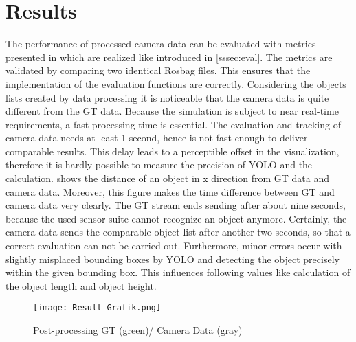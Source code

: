 \section{Results}\label{Results}
	
	The performance of processed camera data can be evaluated with metrics presented in \cite{Reway} which are realized like introduced in \cref{sssec:eval}. The metrics are validated by comparing two identical Rosbag files. This ensures that the implementation of the evaluation functions are correctly.
	Considering the objects lists created by data processing it is noticeable that the camera data is quite different from the \ac{GT} data. Because the simulation is subject to near real-time requirements, a fast processing time is essential. The evaluation and tracking of camera data needs at least 1 second, hence is not fast enough to deliver comparable results. This delay leads to a perceptible offset in the visualization, therefore it is hardly possible to measure the precision of \ac{YOLO} and the calculation.
	 shows the distance of an object in x direction from \ac{GT} data and camera data. Moreover, this figure  makes the time difference between \ac{GT} and camera data very clearly. The \ac{GT} stream ends sending after about nine seconds, because the used sensor suite cannot recognize an object anymore. Certainly, the camera data  sends the comparable object list after another two seconds, so that a correct evaluation can not be carried out. Furthermore, minor errors occur with slightly misplaced bounding boxes by \ac{YOLO} and detecting the object precisely within the given bounding box. This influences following values like calculation of the object length and object height.\\
	\begin{figure}[b]
		\centering
		\texttt{[image: Result-Grafik.png]}
		\caption{Post-processing GT (green)/ Camera Data (gray)}
		\label{fig:result}
	\end{figure}
%	
